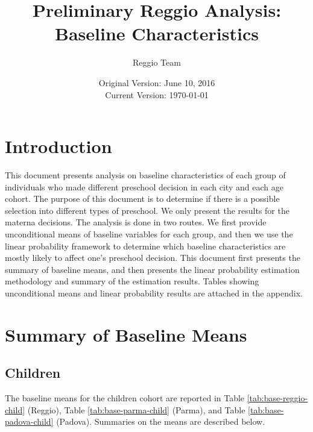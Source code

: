\documentclass[12pt]{article}
\begin{document}
\title{Preliminary Reggio Analysis: Baseline Characteristics}
\author{Reggio Team}
\date{Original Version: June 10, 2016 \\ Current Version: \today}
\maketitle 

\doublespacing
\section{Introduction}

This document presents analysis on baseline characteristics of each group of individuals who made different preschool decision in each city and each age cohort. The purpose of this document is to determine if there is a possible selection into different types of preschool. We only present the results for the materna decisions. The analysis is done in two routes. We first provide unconditional means of baseline variables for each group, and then we use the linear probability framework to determine which baseline characteristics are mostly likely to affect one's preschool decision. This document first presents the summary of baseline means, and then presents the linear probability estimation methodology and summary of the estimation results. Tables showing unconditional means and linear probability results are attached in the appendix. 

\section{Summary of Baseline Means}
\subsection{Children}

The baseline means for the children cohort are reported in Table \ref{tab:base-reggio-child} (Reggio), Table \ref{tab:base-parma-child} (Parma), and Table \ref{tab:base-padova-child} (Padova). Summaries on the means are described below.
\end{document}
